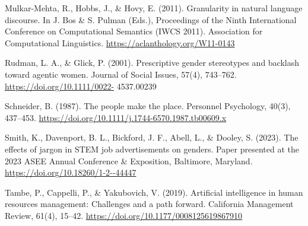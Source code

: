 \documentclass[
]{book}
\begin{document}
Mulkar-Mehta, R., Hobbs, J., \& Hovy, E. (2011). Granularity in natural language discourse. In J. Bos \& S. Pulman (Eds.), Proceedings of the Ninth International Conference on Computational Semantics (IWCS 2011). Association for Computational Linguistics. \url{https://aclanthology.org/W11-0143}

Rudman, L. A., \& Glick, P. (2001). Prescriptive gender stereotypes and backlash toward agentic women. Journal of Social Issues, 57(4), 743--762. \url{https://doi.org/10.1111/0022-} 4537.00239

Schneider, B. (1987). The people make the place. Personnel Psychology, 40(3), 437--453. \url{https://doi.org/10.1111/j.1744-6570.1987.tb00609.x}

Smith, K., Davenport, B. L., Bickford, J. F., Abell, L., \& Dooley, S. (2023). The effects of jargon in STEM job advertisements on genders. Paper presented at the 2023 ASEE Annual Conference \& Exposition, Baltimore, Maryland. \url{https://doi.org/10.18260/1-2--44447}

Tambe, P., Cappelli, P., \& Yakubovich, V. (2019). Artificial intelligence in human resources
management: Challenges and a path forward. California Management Review, 61(4), 15--42. \url{https://doi.org/10.1177/0008125619867910}
\end{document}
